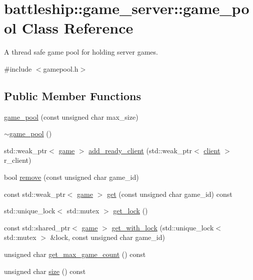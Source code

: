 \hypertarget{classbattleship_1_1game__server_1_1game__pool}{}\section{battleship\+:\+:game\+\_\+server\+:\+:game\+\_\+pool Class Reference}
\label{classbattleship_1_1game__server_1_1game__pool}


A thread safe game pool for holding server games.  




{\ttfamily \#include $<$gamepool.\+h$>$}

\subsection*{Public Member Functions}
\begin{DoxyCompactItemize}
\item 
\hyperlink{classbattleship_1_1game__server_1_1game__pool_a8f1683759e6491fe84b55409873c8163}{game\+\_\+pool} (const unsigned char max\+\_\+size)
\item 
\hyperlink{classbattleship_1_1game__server_1_1game__pool_a595c7d278fc0163b37780d90663663a2}{$\sim$game\+\_\+pool} ()
\item 
std\+::weak\+\_\+ptr$<$ \hyperlink{classbattleship_1_1game__server_1_1game}{game} $>$ \hyperlink{classbattleship_1_1game__server_1_1game__pool_a6d460991bba52fc0d04bd1ee65989ba2}{add\+\_\+ready\+\_\+client} (std\+::weak\+\_\+ptr$<$ \hyperlink{classbattleship_1_1game__server_1_1client}{client} $>$ r\+\_\+client)
\item 
bool \hyperlink{classbattleship_1_1game__server_1_1game__pool_a49cca84e56ae8a98559a6345d147511d}{remove} (const unsigned char game\+\_\+id)
\item 
const std\+::weak\+\_\+ptr$<$ \hyperlink{classbattleship_1_1game__server_1_1game}{game} $>$ \hyperlink{classbattleship_1_1game__server_1_1game__pool_ad6c1392c3842f1a37c762d1c27eba7d2}{get} (const unsigned char game\+\_\+id) const
\item 
std\+::unique\+\_\+lock$<$ std\+::mutex $>$ \hyperlink{classbattleship_1_1game__server_1_1game__pool_ae87384fc2dbf34f7f2769e8763c142b3}{get\+\_\+lock} ()
\item 
const std\+::shared\+\_\+ptr$<$ \hyperlink{classbattleship_1_1game__server_1_1game}{game} $>$ \hyperlink{classbattleship_1_1game__server_1_1game__pool_a47ebc8c0b2d4280ce0d02e0d808230e3}{get\+\_\+with\+\_\+lock} (std\+::unique\+\_\+lock$<$ std\+::mutex $>$ \&lock, const unsigned char game\+\_\+id)
\item 
unsigned char \hyperlink{classbattleship_1_1game__server_1_1game__pool_a4082a1a43dc489fae1d537126c7024c5}{get\+\_\+max\+\_\+game\+\_\+count} () const
\item 
unsigned char \hyperlink{classbattleship_1_1game__server_1_1game__pool_ae35839994dec4bd94fb1dc7134c1e1ff}{size} () const
\end{DoxyCompactItemize}


